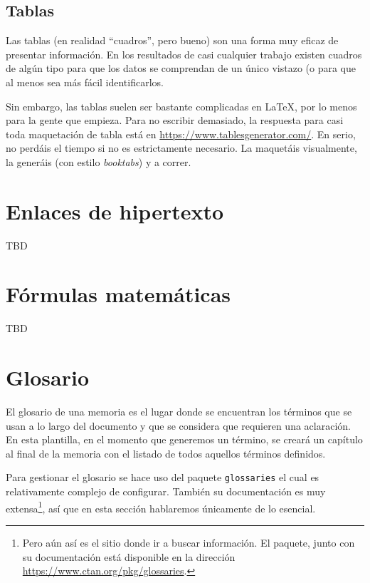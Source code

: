 \documentclass[%
    school=etsisi,%
    type=tfg,%
    degree=61CD,%
]{upm-report}
\begin{document}
\subsection{Tablas}

Las tablas (en realidad \enquote{cuadros}, pero bueno) son una forma muy eficaz de presentar información. En los resultados de casi cualquier trabajo existen cuadros de algún tipo para que los datos se comprendan de un único vistazo (o para que al menos sea más fácil identificarlos.

Sin embargo, las tablas suelen ser bastante complicadas en \LaTeX, por lo menos para la gente que empieza. Para no escribir demasiado, la respuesta para casi toda maquetación de tabla está en \href{https://www.tablesgenerator.com/}{https://www.tablesgenerator.com/}. En serio, no perdáis el tiempo si no es estrictamente necesario. La maquetáis visualmente, la generáis (con estilo \textit{booktabs}) y a correr.

\section{Enlaces de hipertexto}

TBD

\section{Fórmulas matemáticas}

TBD

\section{Glosario}
\label{s:glosario}

El glosario de una memoria es el lugar donde se encuentran los términos que se usan a lo largo del documento y que se considera que requieren una aclaración. En esta plantilla, en el momento que generemos un término, se creará un capítulo al final de la memoria con el listado de todos aquellos términos definidos.

Para gestionar el glosario se hace uso del paquete \texttt{glossaries} el cual es relativamente complejo de configurar. También su documentación es muy extensa\footnote{Pero aún así es el sitio donde ir a buscar información. El paquete, junto con su documentación está disponible en la dirección \href{https://www.ctan.org/pkg/glossaries}{https://www.ctan.org/pkg/glossaries}.}, así que en esta sección hablaremos únicamente de lo esencial.
\end{document}
